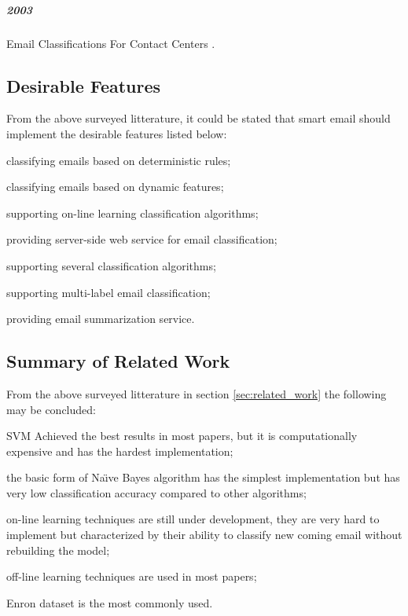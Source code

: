 \subparagraph*{2003}
\begin{my_itemize}
  \item Email Classifications For Contact Centers \cite{ANI03}.
\end{my_itemize}

\subsection{Desirable Features}
\label{desirable_features}
From the above surveyed litterature, it could be stated that smart email should implement the desirable features listed below:
\begin{my_itemize}
  \item classifying emails based on deterministic rules;
  \item classifying emails based on dynamic features;
  \item supporting on-line learning classification algorithms;
  \item providing server-side web service for email classification;
  \item supporting several classification algorithms;
  \item supporting multi-label email classification;
  \item providing email summarization service.
\end{my_itemize}

\subsection{Summary of Related Work}
From the above surveyed litterature in section \ref{sec:related_work} the following may be concluded:
\begin{my_itemize}
    \item SVM Achieved the best results in most papers, but it is computationally 
    expensive and has the hardest implementation;
    \item the basic form of Na\"{\i}ve Bayes algorithm has the simplest implementation 
    but has very low classification accuracy compared to other algorithms;
    \item on-line learning techniques are still under development, they are very 
    hard to implement but characterized by their ability to classify new coming 
    email without rebuilding the model;
    \item off-line learning techniques are used in most papers;
    \item Enron dataset \cite{ENRON} is the most commonly used.
\end{my_itemize}

